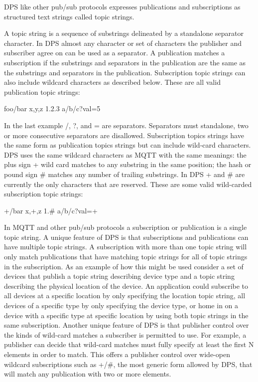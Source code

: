 D\+PS like other pub/sub protocols expresses publications and subscriptions as structured text strings called topic strings.

A topic string is a sequence of substrings delineated by a standalone separator character. In D\+PS almost any character or set of characters the publisher and subscriber agree on can be used as a separator. A publication matches a subscription if the substrings and separators in the publication are the same as the substrings and separators in the publication. Subscription topic strings can also include wildcard characters as described below. These are all valid publication topic strings\+:

\begin{DoxyVerb}foo/bar
x,y,z
1.2.3
a/b/c?val=5
\end{DoxyVerb}


In the last example {\ttfamily /}, {\ttfamily }?, and {\ttfamily =} are separators. Separators must standalone, two or more consecutive separators are disallowed. Subscription topics strings have the same form as publication topics strings but can include wild-\/card characters. D\+PS uses the same wildcard characters as M\+Q\+TT with the same meanings\+: the plus sign {\ttfamily +} wild card matches to any substring in the same position; the hash or pound sign {\ttfamily \#} matches any number of trailing substrings. In D\+PS {\ttfamily +} and {\ttfamily \#} are currently the only characters that are reserved. These are some valid wild-\/carded subscription topic strings\+:

\begin{DoxyVerb}+/bar
x,+,z
1.#
a/b/c?val=+
\end{DoxyVerb}


In M\+Q\+TT and other pub/sub protocols a subscription or publication is a single topic string. A unique feature of D\+PS is that subscriptions and publications can have multiple topic strings. A subscription with more than one topic string will only match publications that have matching topic strings for all of topic strings in the subscription. As an example of how this might be used consider a set of devices that publish a topic string describing device type and a topic string describing the physical location of the device. An application could subscribe to all devices at a specific location by only specifying the location topic string, all devices of a specific type by only specifying the device type, or home in on a device with a specific type at specific location by using both topic strings in the same subscription. Another unique feature of D\+PS is that publisher control over the kinds of wild-\/card matches a subscriber is permitted to use. For example, a publisher can decide that wild-\/card matches must fully specify at least the first N elements in order to match. This offers a publisher control over wide-\/open wildcard subscriptions such as {\ttfamily +/\#}, the most generic form allowed by D\+PS, that will match any publication with two or more elements. 